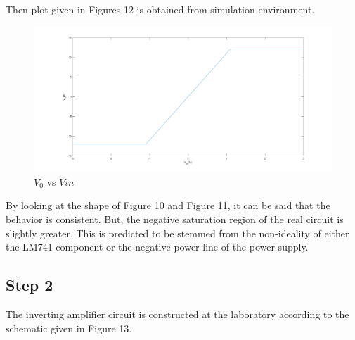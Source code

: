 \documentclass[letterpaper,12pt]{article}
\begin{document}
Then plot given in Figures 12 is obtained from simulation environment.

\begin{figure}[H]
	\centering
   \includegraphics[width=1\textwidth]{3d_vs_vin.png}
   \caption{\(V_0\) vs \(V{in}\)}
\end{figure}
By looking at the shape of Figure 10 and Figure 11, it can be said that the behavior is consistent. But, the negative saturation region of the real circuit is slightly greater. This is predicted to be stemmed from the non-ideality of either the LM741 component or the negative power line of the power supply.
\subsection{Step 2}
The inverting amplifier circuit is constructed at the laboratory according to the schematic given in Figure 13.  
\end{document}
